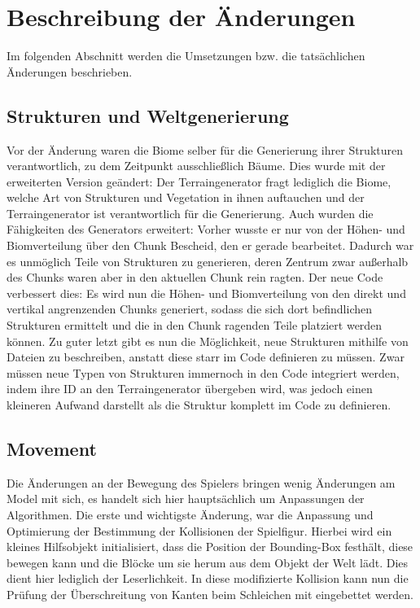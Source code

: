 \documentclass{article}
\begin{document}
\newpage
\section{Beschreibung der Änderungen}

Im folgenden Abschnitt werden die Umsetzungen bzw. die tatsächlichen Änderungen beschrieben.

\subsection{Strukturen und Weltgenerierung}

Vor der Änderung waren die Biome selber für die Generierung ihrer Strukturen verantwortlich, zu dem Zeitpunkt ausschließlich Bäume. Dies wurde mit der erweiterten Version geändert: Der Terraingenerator fragt lediglich die Biome, welche Art von Strukturen und Vegetation in ihnen auftauchen und der Terraingenerator ist verantwortlich für die Generierung. Auch wurden die Fähigkeiten des Generators erweitert: Vorher wusste er nur von der Höhen- und Biomverteilung über den Chunk Bescheid, den er gerade bearbeitet. Dadurch war es unmöglich Teile von Strukturen zu generieren, deren Zentrum zwar außerhalb des Chunks waren aber in den aktuellen Chunk rein ragten. Der neue Code verbessert dies: Es wird nun die Höhen- und Biomverteilung von den direkt und vertikal angrenzenden Chunks generiert, sodass die sich dort befindlichen Strukturen ermittelt und die in den Chunk ragenden Teile platziert werden können. Zu guter letzt gibt es nun die Möglichkeit, neue Strukturen mithilfe von Dateien zu beschreiben, anstatt diese starr im Code definieren zu müssen. Zwar müssen neue Typen von Strukturen immernoch in den Code integriert werden, indem ihre ID an den Terraingenerator übergeben wird, was jedoch einen kleineren Aufwand darstellt als die Struktur komplett im Code zu definieren.

\subsection{Movement}


Die Änderungen an der Bewegung des Spielers bringen wenig Änderungen am Model mit sich, es handelt sich hier hauptsächlich um Anpassungen der Algorithmen. Die erste und wichtigste Änderung, war die Anpassung und Optimierung der Bestimmung der Kollisionen der Spielfigur. Hierbei wird ein kleines Hilfsobjekt initialisiert, dass die Position der Bounding-Box festhält, diese bewegen kann und die Blöcke um sie herum aus dem Objekt der Welt lädt. Dies dient hier lediglich der Leserlichkeit. In diese modifizierte Kollision kann nun die Prüfung der Überschreitung von Kanten beim Schleichen mit eingebettet werden. 
\end{document}
